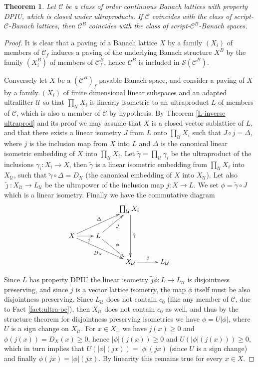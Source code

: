 \documentclass[11pt]{amsart}
\theoremstyle{plain}
\newtheorem{theorem}{Theorem}[section]
\theoremstyle{remark}
\newcommand{\C}{\mathcal C}
\newcommand{\U}{\mathcal U}
\begin{document}
\begin{theorem}
Let $\C$ be a class of order continuous Banach lattices with property DPIU, which is closed under ultraproducts. If $\C$ coincides with the class of script-$\C$-Banach lattices, then $\C^B$ coincides with the class of script-$\C^B$-Banach spaces. 
\end{theorem}

\begin{proof}
It is clear that a paving of a Banach lattice $X$ by a family $(X_i)$ of members of $\C_f$ induces a paving of the underlying Banach structure $X^B$ by the family $(X^B_i)$ of members of $\C^B_f$, hence $\C^B$ is included in $\mathcal S(\C^B)$.

Conversely let $X$ be a $(\C^B)_f$-pavable Banach space, and consider a paving of $X$ by a family $(X_i)$ of finite dimensional linear subspaces and an adapted ultrafilter $\U$ so that $\prod_\U X_i$ is linearly isometric to an ultraproduct $L$ of members of $\C$, which is also a member of $\C$ by hypothesis. By Theorem \ref{L-inverse ultraprod} and its proof we may assume that $X$ is a closed vector sublattice of $L$, and that there exists a linear isometry $J$ from $L$ onto $\prod_\U X_i$ such that $J\circ j=\Delta$, where $j$ is the inclusion map from $X$ into $L$ and $\Delta$ is the canonical linear isometric embedding of $X$ into $\prod_\U X_i$. Let $\tilde \gamma=\prod_\U \gamma_i$ be the ultraproduct of the inclusions  $\gamma_i: X_i\to X$, then $\tilde \gamma$ is a linear isometric embedding from $\prod_\U X_i$ into $X_\U$, such that $\tilde \gamma\circ \Delta=D_X$ (the canonical embedding of $X$ into $X_\U$). Let also $\tilde\jmath: X_\U\to L_\U$ be the  ultrapower of the inclusion map $j: X\to L$. We set $\phi=\tilde \gamma\circ J$ which is a linear isometry. Finally we have the commutative diagram
\[\xymatrix{&&\!\!\prod_\U X_i\ar^{\tilde\gamma}[dd]&&\\X\ar^\Delta[urr]\ar_{\phantom{jjj}j}[r]\ar_{D_X}[drr]&L\ar_J[ur]\ar^\phi[dr]&&\\& &X_\U \ar^{\tilde\jmath}[r]&L_\U }\]

Since $L$ has property DPIU the  linear isometry  $\tilde j\phi:L\to L_\U$ is disjointness preserving, and since $\tilde j$ is a vector lattice isometry, the map $\phi$ itself must be also disjointness preserving. Since $L_\U$ does not contain $c_0$ (like any member of $\C$, due to Fact \ref{fact:ultra-oc}), then  $X_\U$ does not contain $c_0$ as well, and thus by the structure theorem for disjointness preserving isometries we have $\phi=U|\phi|$, where $U$ is a sign change on $X_\U$. For $x\in X_+$ we have $j(x)\ge 0$ and $\phi(j(x))=D_X(x)\ge 0$, hence $|\phi|(j(x))\ge 0$ and $U(|\phi|(j(x)))\ge 0$, which in turn implies that  $U(|\phi|(jx))=|\phi|(jx)$ (since $U$ is a sign change) and finally $\phi(jx)=|\phi|(jx)$. By linearity this remains true for every $x\in X$.


\end{proof}
\end{document}
